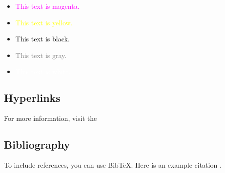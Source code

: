 \documentclass{article}
\begin{document}
	\begin{itemize}
		\item \textcolor{magenta}{This text is magenta.}
		\item \textcolor{yellow}{This text is yellow.}
		\item \textcolor{black}{This text is black.}
		\item \textcolor{gray}{This text is gray.}
		\item \textcolor{white}{This text is white.}
	\end{itemize}
	
	\subsection{Hyperlinks}
	For more information, visit the 
	
	\subsection{Bibliography}
	To include references, you can use BibTeX. Here is an example citation \cite{Doe24}.
	
	
	
	
\end{document}
